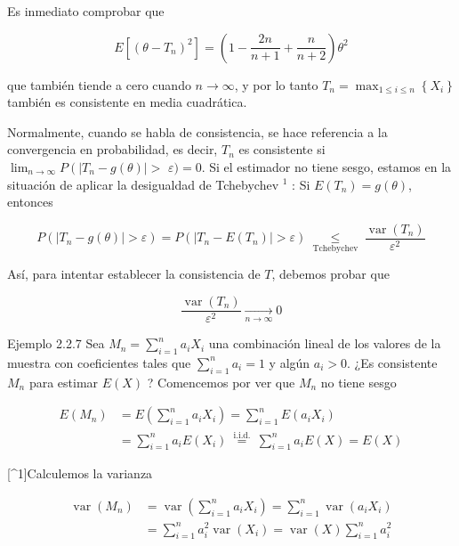 \documentclass[
]{article}
\begin{document}
Es inmediato comprobar que

\[
E\left[\left(\theta-T_{n}\right)^{2}\right]=\left(1-\frac{2 n}{n+1}+\frac{n}{n+2}\right) \theta^{2}
\]

que también tiende a cero cuando \(n \rightarrow \infty\), y por lo tanto \(T_{n}=\max _{1 \leq i \leq n}\left\{X_{i}\right\}\) también es consistente en media cuadrática.

Normalmente, cuando se habla de consistencia, se hace referencia a la convergencia en probabilidad, es decir, \(T_{n}\) es consistente si \(\lim _{n \rightarrow \infty} P\left(\left|T_{n}-g(\theta)\right|>\right.\) \(\varepsilon)=0\). Si el estimador no tiene sesgo, estamos en la situación de aplicar la desigualdad de Tchebychev \({ }^{1}\) :
Si \(E\left(T_{n}\right)=g(\theta)\), entonces

\[
P\left(\left|T_{n}-g(\theta)\right|>\varepsilon\right)=P\left(\left|T_{n}-E\left(T_{n}\right)\right|>\varepsilon\right) \underset{\text { Tchebychev }}{\leq} \frac{\operatorname{var}\left(T_{n}\right)}{\varepsilon^{2}}
\]

Así, para intentar establecer la consistencia de \(T\), debemos probar que

\[
\frac{\operatorname{var}\left(T_{n}\right)}{\varepsilon^{2}} \underset{n \rightarrow \infty}{\longrightarrow} 0
\]

Ejemplo 2.2.7 Sea \(M_{n}=\sum_{i=1}^{n} a_{i} X_{i}\) una combinación lineal de los valores de la muestra con coeficientes tales que \(\sum_{i=1}^{n} a_{i}=1\) y algún \(a_{i}>0\). ¿Es consistente \(M_{n}\) para estimar \(E(X)\) ?
Comencemos por ver que \(M_{n}\) no tiene sesgo

\[
\begin{aligned}
E\left(M_{n}\right) & =E\left(\sum_{i=1}^{n} a_{i} X_{i}\right)=\sum_{i=1}^{n} E\left(a_{i} X_{i}\right) \\
& =\sum_{i=1}^{n} a_{i} E\left(X_{i}\right) \stackrel{\text { i.i.d. }}{=} \sum_{i=1}^{n} a_{i} E(X)=E(X)
\end{aligned}
\]

{[}\^{}1{]}Calculemos la varianza

\[
\begin{aligned}
\operatorname{var}\left(M_{n}\right) & =\operatorname{var}\left(\sum_{i=1}^{n} a_{i} X_{i}\right)=\sum_{i=1}^{n} \operatorname{var}\left(a_{i} X_{i}\right) \\
& =\sum_{i=1}^{n} a_{i}^{2} \operatorname{var}\left(X_{i}\right)=\operatorname{var}(X) \sum_{i=1}^{n} a_{i}^{2}
\end{aligned}
\]
\end{document}
